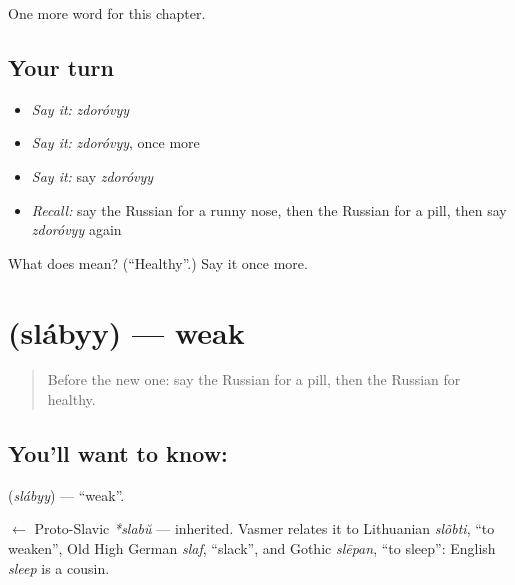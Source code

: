 \begin{grammarlens}[title={What you've built}]
One more word for this chapter.
\end{grammarlens}

\subsection*{Your turn}
\begin{itemize}
\raggedright
  \item \emph{Say it:} \emph{zdoróvyy}
  \item \emph{Say it:} \emph{zdoróvyy}, once more
  \item \emph{Say it:} say \emph{zdoróvyy}
  \item \emph{Recall:} say the Russian for a runny nose, then the Russian for a pill, then say \emph{zdoróvyy} again
\end{itemize}

\begin{tcolorbox}[breakable,colback=teal!4,colframe=teal!35!black,title={Before you move on}]
What does  mean? (\textquotedblleft{}Healthy\textquotedblright{}.) Say it once more.
\end{tcolorbox}
\section[\texorpdfstring{\ru{слабый} (slábyy)}{слабый (slábyy)}]{ (slábyy) — weak}

\label{lesson:RU-C148-slabyy}



\begin{quote}
Before the new one: say the Russian for a pill, then the Russian for healthy.
\end{quote}

\subsection*{You'll want to know: }
\textbf{} (\emph{slábyy}) — \textquotedblleft{}weak\textquotedblright{}.

\begin{cousinweb}
\textbf{} $\leftarrow$ Proto-Slavic \emph{*slabŭ} — inherited. Vasmer relates it to Lithuanian \emph{slõbti}, \textquotedblleft{}to weaken\textquotedblright{}, Old High German \emph{slaf}, \textquotedblleft{}slack\textquotedblright{}, and Gothic \emph{slēpan}, \textquotedblleft{}to sleep\textquotedblright{}: English \emph{sleep} is a cousin.
\end{cousinweb}

